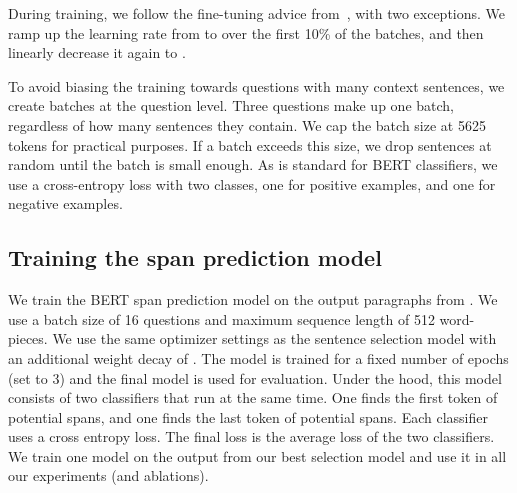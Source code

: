 \documentclass[11pt,a4paper]{article}
\begin{document}
During training, we follow the fine-tuning advice from~\cite{devlin2018bert}, with two exceptions. We ramp up the learning rate from  to  over the first 10\% of the batches, and then linearly decrease it again to .

To avoid biasing the training towards questions with many context sentences, we create batches at the question level. Three questions make up one batch, regardless of how many sentences they contain. We cap the batch size at 5625 tokens for practical purposes. If a batch exceeds this size, we drop sentences at random until the batch is small enough.
As is standard for BERT classifiers, we use a cross-entropy loss with two classes, one for positive examples, and one for negative examples.

\subsection{Training the span prediction model}
\label{appendix:training_qa}
We train the BERT span prediction model on the output paragraphs from . We use a batch size of 16 questions and maximum sequence length of 512 word-pieces. We use the same optimizer settings as the sentence selection model with an additional weight decay of . The model is trained for a fixed number of epochs (set to 3) and the final model is used for evaluation.
Under the hood, this model consists of two classifiers that run at the same time. One finds the first token of potential spans, and one finds the last token of potential spans. Each classifier uses a cross entropy loss. The final loss is the average loss of the two classifiers.
We train one model on the output from our best  selection model and use it in all our experiments (and ablations).
\end{document}
